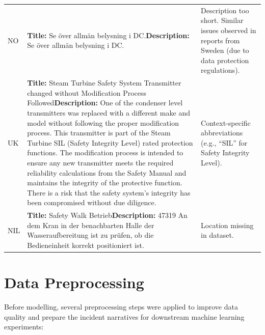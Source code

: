 \documentclass[11pt, titlepage, bibliography=totoc]{scrreprt}
\begin{document}
\begin{table}[h!]
\begin{footnotesize}
\begin{tabular}{p{1.3cm} p{8.2cm} p{6.5cm}}
\addlinespace
NO & \textbf{Title:} Se över allmän belysning i DC.\newline \textbf{Description:} Se över allmän belysning i DC. & Description too short. Similar issues observed in reports from Sweden (due to data protection regulations). \\
\addlinespace
UK & \textbf{Title:} Steam Turbine Safety System Transmitter changed without Modification Process Followed\newline \textbf{Description:} One of the condenser level transmitters was replaced with a different make and model without following the proper modification process. This transmitter is part of the Steam Turbine SIL (Safety Integrity Level) rated protection functions. The modification process is intended to ensure any new transmitter meets the required reliability calculations from the Safety Manual and maintains the integrity of the protective function. There is a risk that the safety system’s integrity has been compromised without due diligence. & Context-specific abbreviations (e.g., ``SIL'' for Safety Integrity Level). \\
\addlinespace
NIL & \textbf{Title:} Safety Walk Betrieb\newline \textbf{Description:} 47319 An dem Kran in der benachbarten Halle der Wasseraufbereitung ist zu prüfen, ob die Bedieneinheit korrekt positioniert ist. & Location missing in dataset. \\
\bottomrule
\end{tabular}
\end{footnotesize}
\end{table}

\section{Data Preprocessing}

Before modelling, several preprocessing steps were applied to improve data quality and prepare the incident narratives for downstream machine learning experiments:
\end{document}

